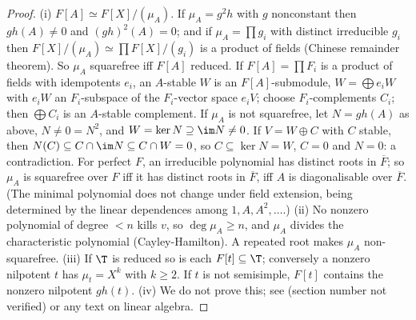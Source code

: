 \begin{proof}
(i) $F[A]\simeq F[X]/(\mu_A)$. If $\mu_A=g^2h$ with $g$ nonconstant then $gh(A)\ne0$ and $(gh)^2(A)=0$; and if $\mu_A=\prod g_i$ with distinct irreducible $g_i$ then
$F[X]/(\mu_A)\simeq\prod F[X]/(g_i)$ is a product of fields (Chinese remainder theorem). So $\mu_A$ squarefree iff $F[A]$ reduced. If $F[A]=\prod F_i$ is a product of fields
with idempotents $e_i$, an $A$-stable $W$ is an $F[A]$-submodule, $W=\bigoplus e_iW$ with $e_iW$ an $F_i$-subspace of the $F_i$-vector space $e_iV$; choose $F_i$-complements
$C_i$; then $\bigoplus C_i$ is an $A$-stable complement. If $\mu_A$ is not squarefree, let $N=gh(A)$ as above, $N\ne0=N^2$, and $W=\ker N\supseteq\im N\ne0$. If $V=W\oplus C$ with $C$
stable, then $N(C)\subseteq C\cap\im N\subseteq C\cap W=0$, so $C\subseteq\ker N=W$, $C=0$ and $N=0$: a contradiction. For perfect $F$, an irreducible polynomial has distinct
roots in $\overline F$; so $\mu_A$ is squarefree over $F$ iff it has distinct roots in $\overline F$, iff $A$ is diagonalisable over $\overline F$. (The minimal polynomial does
not change under field extension, being determined by the linear dependences among $1,A,A^2,\dots$.)
(ii) No nonzero polynomial of degree $<n$ kills $v$, so $\deg\mu_A\ge n$, and $\mu_A$ divides the characteristic polynomial (Cayley-Hamilton). A repeated root makes
$\mu_A$ non-squarefree.
(iii) If $\T$ is reduced so is each $F[t]\subseteq\T$; conversely a nonzero nilpotent $t$ has $\mu_t=X^k$ with $k\ge2$. If $t$ is not semisimple, $F[t]$ contains the nonzero
nilpotent $gh(t)$.
(iv) We do not prove this; see \cite[Section 12.3]{DummitFoote} (section number not verified) or any text on linear algebra.
\end{proof}

